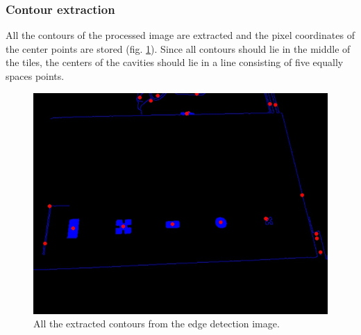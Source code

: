 \documentclass{article}
\begin{document}
\subsubsection*{Contour extraction}
All the contours of the processed image are extracted and the pixel coordinates of the center points are stored (fig. \ref{fig:cavities}). Since all contours should lie in the middle of the tiles, the centers of the cavities should lie in a line consisting of five equally spaces points. \\
\begin{figure}[h!]
\centering
\includegraphics[scale=0.3]{images/cavitycontours.jpg}
\caption{All the extracted contours from the edge detection image.}
\label{fig:cavities}
\end{figure}
\end{document}
